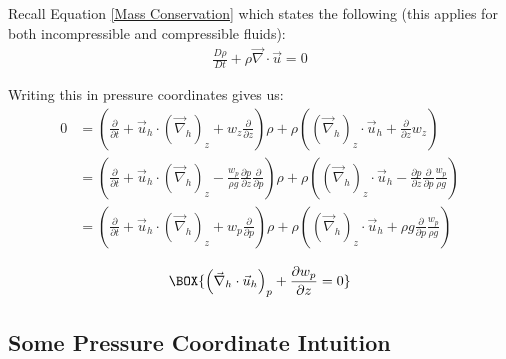 Recall Equation \ref{Mass Conservation} which states the following (this applies for both incompressible and compressible fluids):
\begin{align*}
    \frac{D\rho}{Dt}+\rho\vec{\nabla}\cdot\vec{u}=0
\end{align*}

Writing this in pressure coordinates gives us:
\begin{align*}
    0&=\left( 
        \frac{\partial}{\partial t} 
        + \vec{u}_h \cdot \left( \vec{\nabla}_h \right)_z
        + w_z \frac{\partial}{\partial z}
    \right)\rho
    + \rho \left( 
        \left( \vec{\nabla}_h  \right)_z \cdot \vec{u}_h
        + \frac{\partial}{\partial z}w_z
    \right)
    \\
    &=\left( 
        \frac{\partial}{\partial t} 
        + \vec{u}_h \cdot \left( \vec{\nabla}_h \right)_z
        - \frac{w_p}{\rho g} \frac{\partial p}{\partial z}\frac{\partial}{\partial p}
    \right)\rho
    + \rho \left( 
        \left( \vec{\nabla}_h  \right)_z \cdot \vec{u}_h
        - \frac{\partial p}{\partial z} \frac{\partial}{\partial p} \frac{w_p}{\rho g}
    \right)
    \\
    &=\left( 
        \frac{\partial}{\partial t} 
        + \vec{u}_h \cdot \left( \vec{\nabla}_h \right)_z
        + w_p \frac{\partial}{\partial p}
    \right)\rho
    + \rho \left( 
        \left( \vec{\nabla}_h  \right)_z \cdot \vec{u}_h
        +\rho g \frac{\partial}{\partial p} \frac{w_p}{\rho g}
    \right)
\end{align*}



\begin{align}
    \label{Mass Conservation Pressure}
    \BOX{
        \left( \vec{\nabla}_h \cdot\vec{u}_h \right)_p
        +
        \frac{\partial w_p}{\partial z}=0
    }
\end{align}

\subsection{Some Pressure Coordinate Intuition}

